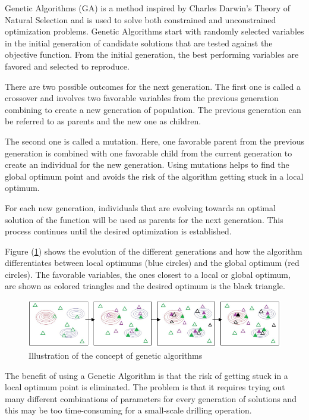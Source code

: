 Genetic Algorithms (GA) is a method inspired by Charles Darwin’s Theory of Natural Selection and is used to solve both constrained and unconstrained optimization problems. Genetic Algorithms start with randomly selected variables in the initial generation of candidate solutions that are tested against the objective function. From the initial generation, the best performing variables are favored and selected to reproduce. 

There are two possible outcomes for the next generation. The first one is called a crossover and involves two favorable variables from the previous generation combining to create a new generation of population. The previous generation can be referred to as parents and the new one as children. 

The second one is called a mutation. Here, one favorable parent from the previous generation is combined with one favorable child from the current generation to create an individual for the new generation. Using mutations helps to find the global optimum point and avoids the risk of the algorithm getting stuck in a local optimum. 

For each new generation, individuals that are evolving towards an optimal solution of the function will be used as parents for the next generation. This process continues until the desired optimization is established. 

Figure (\ref{fig:genetic}) shows the evolution of the different generations and how the algorithm differentiates between local optimums (blue circles) and the global optimum (red circles). The favorable variables, the ones closest to a local or global optimum, are shown as colored triangles and the desired optimum is the black triangle.

\begin{figure} [H]
\centering
\includegraphics[width=1\textwidth]{figures/genetic.PNG}
\caption{Illustration of the concept of genetic algorithms}
\label{fig:genetic}
\end{figure}


The benefit of using a Genetic Algorithm is that the risk of getting stuck in a local optimum point is eliminated. The problem is that it requires trying out many different combinations of parameters for every generation of solutions and this may be too time-consuming for a small-scale drilling operation.

